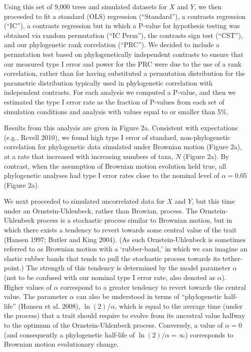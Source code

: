 \documentclass[fleqn,10pt,lineno]{wlpeerj} %
\begin{document}
Using this set of 9,000 trees and simulated datasets for \(X\) and \(Y\), we then proceeded to fit a standard (OLS) regression (``Standard''), a contrasts regression (``IC''), a contrasts regression but in which a P-value for hypothesis testing was obtained via random permutation (``IC Perm''), the contrasts sign test (``CST''), and our phylogenetic rank correlation (``PRC''). We decided to include a permutation test based on phylogenetically independent contrasts to ensure that our measured type I error and power for the PRC were due to the use of a rank correlation, rather than for having substituted a permutation distribution for the parametric distribution typically used in phylogenetic correlation with independent contrasts. For each analysis we computed a P-value, and then we estimated the type I error rate as the fraction of P-values from each set of simulation conditions and analysis with values equal to or smaller than 5\%.

Results from this analysis are given in Figure 2a. Consistent with expectations (e.g., Revell 2010), we found high type I error of standard, non-phylogenetic correlation for phylogenetic data simulated under Brownian motion (Figure 2a), at a rate that increased with increasing numbers of taxa, \(N\) (Figure 2a). By contrast, when the assumption of Brownian motion evolution held true, all phylogenetic analyses had type I error rates close to the nominal level of \(\alpha = 0.05\) (Figure 2a).

We next proceeded to simulated uncorrelated data for \(X\) and \(Y\), but this time under an Ornstein-Uhlenbeck, rather than Browian, process. The Ornstein-Uhlenbeck process is a stochastic process similar to Brownian motion, but in which there exists a tendency to revert towards some central value of the trait (Hansen 1997; Butler and King 2004). (As such Ornstein-Uhlenbeck is sometimes referred to as Brownian motion with a `rubber-band,' in which we can imagine an elastic rubber bands that tends to pull the stochastic process towards its tether-point.) The strength of this tendency is determined by the model parameter \(\alpha\) (not to be confused with our nominal type I error rate, also denoted as \(\alpha\)). Higher values of \(\alpha\) correspond to a greater tendency to revert towards the central value. The parameter \(\alpha\) can also be understood in terms of ``phylogenetic half-life'' (Hansen et al. 2008), \(\ln(2)/\alpha\), which is equal to the average time (under the process) that a trait should require to evolve from its ancestral value halfway to the optimum of the Ornstein-Uhlenbeck process. Conversely, a value of \(\alpha = 0\) (and consequently a phylogenetic half-life of \(\ln(2)/\alpha = \infty\)) corresponds to Brownian motion evolutionary change.
\end{document}
